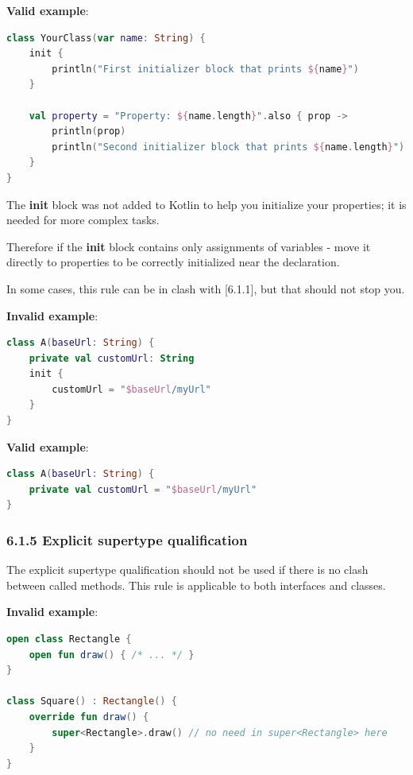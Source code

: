 \textbf{Valid example}:

\begin{lstlisting}[language=Kotlin]
class YourClass(var name: String) {
    init {
        println("First initializer block that prints ${name}")
    }

    val property = "Property: ${name.length}".also { prop ->
        println(prop)
        println("Second initializer block that prints ${name.length}")
    }
}
\end{lstlisting}


The \textbf{init} block was not added to Kotlin to help you initialize your properties; it is needed for more complex tasks. 

Therefore if the \textbf{init} block contains only assignments of variables - move it directly to properties to be correctly initialized near the declaration.

In some cases, this rule can be in clash with [6.1.1], but that should not stop you.



\textbf{Invalid example}:

\begin{lstlisting}[language=Kotlin]
class A(baseUrl: String) {
    private val customUrl: String
    init {
        customUrl = "$baseUrl/myUrl"
    }
}
\end{lstlisting}


\textbf{Valid example}:

\begin{lstlisting}[language=Kotlin]
class A(baseUrl: String) {
    private val customUrl = "$baseUrl/myUrl"
}
\end{lstlisting}


\subsubsection*{\textbf{6.1.5 Explicit supertype qualification}}
\leavevmode\newline

\label{sec:6.1.5}

The explicit supertype qualification should not be used if there is no clash between called methods. This rule is applicable to both interfaces and classes.



\textbf{Invalid example}:

\begin{lstlisting}[language=Kotlin]
open class Rectangle {
    open fun draw() { /* ... */ }
}

class Square() : Rectangle() {
    override fun draw() {
        super<Rectangle>.draw() // no need in super<Rectangle> here
    }
}
\end{lstlisting}


